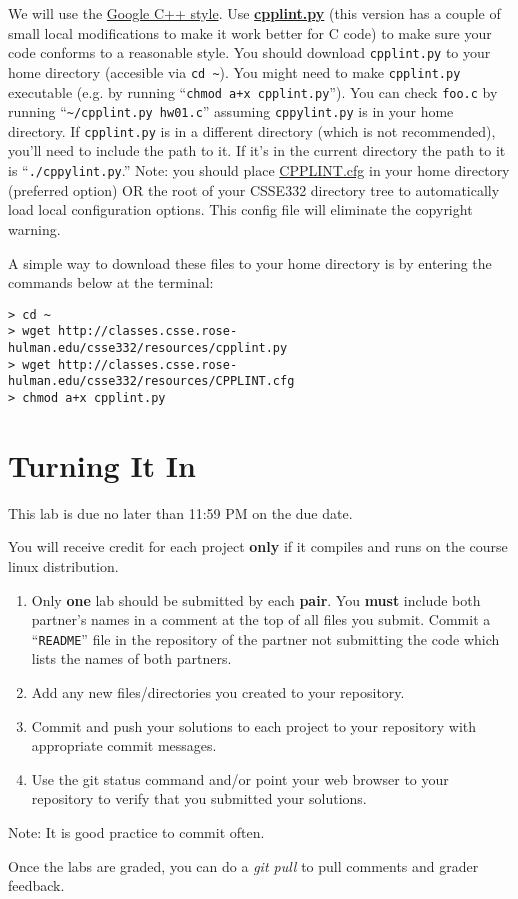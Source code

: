 \documentclass[12pt]{article}
\begin{document}
We will use the \href{http://google.github.io/styleguide/cppguide.html}{Google C++
  style}.  Use
  \href{../resources/cpplint.py}{\textbf{cpplint.py}}
  (this version has a couple of small local modifications to make it
  work better for C code) to make sure your code conforms to a
  reasonable style.  You should download \texttt{cpplint.py} to your
  home directory (accesible via \texttt{cd \textasciitilde{}}).  You might need
  to make \texttt{cpplint.py} executable (e.g. by running
  ``\texttt{chmod a+x cpplint.py}''). You can check \texttt{foo.c} by
  running ``\texttt{\textasciitilde{}/cpplint.py hw01.c}'' assuming
  \texttt{cppylint.py} is in your home directory.  If
  \texttt{cpplint.py} is in a different directory (which is not
  recommended), you'll need to include the path to it.  If it's in the
  current directory the path to it is ``\texttt{./cppylint.py}.''
  Note: you should place
  \href{../resources/CPPLINT.cfg}{CPPLINT.cfg} in your
  home directory (preferred option) OR the root of your CSSE332
  directory tree to automatically load local configuration options.
  This config file will eliminate the copyright warning.

  A simple way to download these files to your home directory is by 
  entering the commands below at the terminal:

\begin{verbatim}
> cd ~
> wget http://classes.csse.rose-hulman.edu/csse332/resources/cpplint.py
> wget http://classes.csse.rose-hulman.edu/csse332/resources/CPPLINT.cfg
> chmod a+x cpplint.py
\end{verbatim}

\section{Turning It In}

This lab is due no later than 11:59 PM on the due date.

You will receive credit for each project \textbf{only} if it compiles
and runs on the course linux distribution.

\begin{enumerate}
  \item Only \textbf{one} lab should be submitted by each
  \textbf{pair}.  You \textbf{must} include both partner's names in a
  comment at the top of all files you submit.  Commit a
  ``\texttt{README}'' file in the repository of the partner not
  submitting the code which lists the names of both partners.

  \item Add any new files/directories you created to your repository.

  \item Commit and push your solutions to each project to your repository 
  with appropriate commit messages.

  \item Use the git status command and/or point your web browser to
  your repository to verify that you submitted your solutions.
\end{enumerate}

Note: It is good practice to commit often.

Once the labs are graded, you can do a \textit{git pull} to pull 
comments and grader feedback.
\end{document}
